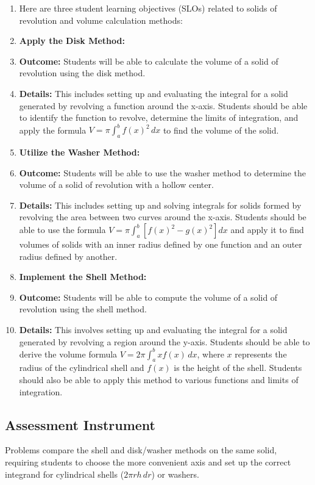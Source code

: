 \begin{enumerate}
    \item Here are three student learning objectives (SLOs) related to solids of revolution and volume calculation methods:
    \item \textbf{Apply the Disk Method:}
    \item \textbf{Outcome:} Students will be able to calculate the volume of a solid of revolution using the disk method.
    \item \textbf{Details:} This includes setting up and evaluating the integral for a solid generated by revolving a function around the x-axis. Students should be able to identify the function to revolve, determine the limits of integration, and apply the formula \(V = \pi \int_a^b f(x)^2 \, dx\) to find the volume of the solid.
    \item \textbf{Utilize the Washer Method:}
    \item \textbf{Outcome:} Students will be able to use the washer method to determine the volume of a solid of revolution with a hollow center.
    \item \textbf{Details:} This includes setting up and solving integrals for solids formed by revolving the area between two curves around the x-axis. Students should be able to use the formula \(V = \pi \int_a^b \left[f(x)^2 - g(x)^2\right] dx\) and apply it to find volumes of solids with an inner radius defined by one function and an outer radius defined by another.
    \item \textbf{Implement the Shell Method:}
    \item \textbf{Outcome:} Students will be able to compute the volume of a solid of revolution using the shell method.
    \item \textbf{Details:} This involves setting up and evaluating the integral for a solid generated by revolving a region around the y-axis. Students should be able to derive the volume formula \(V = 2\pi \int_a^b x f(x) \, dx\), where \(x\) represents the radius of the cylindrical shell and \(f(x)\) is the height of the shell. Students should also be able to apply this method to various functions and limits of integration.
\end{enumerate}

\subsection{Assessment Instrument}
\label{ssec:volu-b407}

Problems compare the shell and disk/washer methods on the same solid, requiring students to choose the more convenient axis and set up the correct integrand for cylindrical shells ($2\pi r h \,dr$) or washers.

